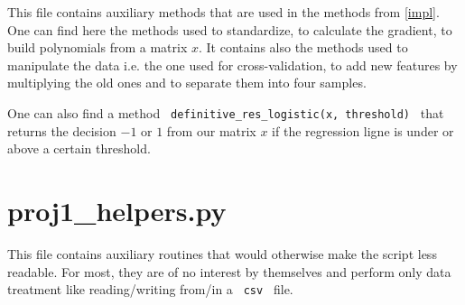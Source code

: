 \documentclass[11pt, oneside]{article}   	%
\begin{document}
This file contains auxiliary methods that are used in the methods from \ref{impl}. One can find here the methods used to standardize, to calculate the gradient, to build polynomials from a matrix $x$. It contains also the methods used to manipulate the data i.e. the one used for cross-validation, to add new features by multiplying the old ones and to separate them into four samples.

One can also find a method \lstinline" definitive_res_logistic(x, threshold) " that returns the decision $-1$ or $1$ from our matrix $x$ if the regression ligne is under or above a certain threshold.

\section{proj1\_helpers.py}

This file contains auxiliary routines that would otherwise make the script less readable. For most, they are of no interest by themselves and perform only data treatment like reading/writing from/in a \lstinline" csv " file.
\end{document}
